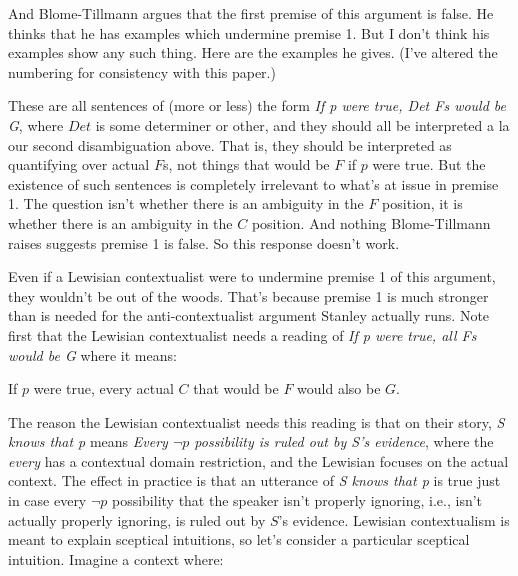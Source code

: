 \noindent And Blome-Tillmann argues that the first premise of this argument is false. He thinks that he has examples which undermine premise 1. But I don't think his examples show any such thing. Here are the examples he gives. (I've altered the numbering for consistency with this paper.)


\noindent These are all sentences of (more or less) the form \textit{If p were true, Det Fs would be G}, where \(Det\) is some determiner or other, and they should all be interpreted a la our second disambiguation above. That is, they should be interpreted as quantifying over actual $F$s, not things that would be $F$ if $p$ were true. But the existence of such sentences is completely irrelevant to what's at issue in premise 1. The question isn't whether there is an ambiguity in the $F$ position, it is whether there is an ambiguity in the $C$ position. And nothing Blome-Tillmann raises suggests premise 1 is false. So this response doesn't work.

Even if a Lewisian contextualist were to undermine premise 1 of this argument, they wouldn't be out of the woods. That's because premise 1 is much stronger than is needed for the anti-contextualist argument Stanley actually runs. Note first that the Lewisian contextualist needs a reading of \textit{If p were true, all Fs would be G} where it means:

\begin{itemize*}
\item If $p$ were true, every actual $C$ that would be $F$ would also be $G$.
\end{itemize*}

\noindent The reason the Lewisian contextualist needs this reading is that on their story, \textit{S knows that p} means \textit{Every $\neg p$ possibility is ruled out by S's evidence}, where the \textit{every} has a contextual domain restriction, and the Lewisian focuses on the actual context. The effect in practice is that an utterance of \textit{S knows that p} is true just in case every $\neg p$ possibility that the speaker isn't properly ignoring, i.e., isn't actually properly ignoring, is ruled out by $S$'s evidence. Lewisian contextualism is meant to explain sceptical intuitions, so let's consider a particular sceptical intuition. Imagine a context where:


